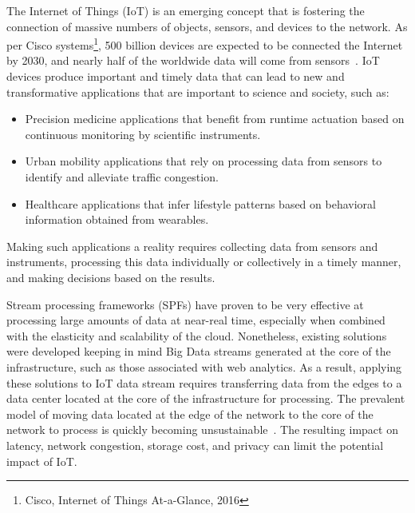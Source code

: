 
The Internet of Things (IoT) is an emerging concept that is fostering the connection of massive numbers of objects, sensors, and devices to the network. As per Cisco systems\footnote{Cisco, Internet of Things At-a-Glance, 2016 }, 500 billion devices are expected to be connected the Internet by 2030, and nearly half of the worldwide data will come from sensors~\cite{McAuley}. 
%
IoT devices produce important and timely data that can lead to new and transformative applications that are important to science and society, such as:
%
\begin{itemize} 
  \item Precision medicine applications that benefit from runtime actuation based on continuous monitoring by scientific instruments.
  \item Urban mobility applications that rely on processing data from sensors to identify and alleviate traffic congestion. 
  \item Healthcare applications that infer lifestyle patterns based on behavioral information obtained from wearables. 
\end{itemize} 

Making such applications a reality requires collecting data from sensors and instruments, processing this data individually or collectively in a timely manner, and making decisions based on the results. 

Stream processing frameworks (SPFs) have proven to be very effective at processing large amounts of data at near-real time, especially when combined with the elasticity and scalability of the cloud. Nonetheless, existing solutions were developed keeping in mind Big Data streams generated at the core of the infrastructure, such as those associated with web analytics. As a result, applying these solutions to IoT data stream requires transferring data from the edges to a data center located at the core of the infrastructure for processing. The prevalent model of moving data located at the edge of the network to the core of the network to process is quickly becoming unsustainable~\cite{intro}. The resulting impact on latency, network congestion, storage cost, and privacy can limit the potential impact of IoT.

